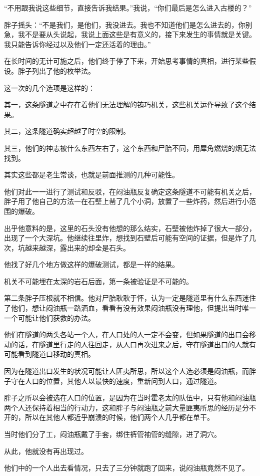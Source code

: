“不用跟我说这些细节，直接告诉我结果。”我说，“你们最后是怎么进入古楼的？”

胖子摇头：“不是我们，是他们，我没进去。我也不知道他们是怎么进去的，你别急，我不是要从头说起，我说上面这些是有意义的，接下来发生的事情就是关键。我只能告诉你经过以及他们一定还活着的理由。”

在长时间的无计可施之后，他们终于停了下来，开始思考事情的真相，进行某些假设。胖子列出了他的枚举法。

这一次的几个选项是这样的：

其一，这条隧道之中存在着他们无法理解的铕巧机关，这些机关运作导致了这个结果。

其二，这条隧道确实超越了时空的限制。

其三，他们的神志被什么东西左右了，这个东西和尸胎不同，用犀角燃烧的烟无法找到。

其实这些都是老生常谈，也就是前面推测的几种可能性。

他们对此一一进行了测试和反驳，在闷油瓶反复确定这条隧道不可能有机关之后，胖子用了他自己的方法一在石壁上凿了几个小洞，放置了一些炸药，然后进行小范围的爆破。

出乎他意料的是，这里的石头没有他想的那么结实，石壁被他炸掉了很大一部分，出现了一个大深坑。他继续往里炸，想找到石壁后可能有空间的证据，但是炸了几次，坑越来越深，露出来的却全是石头。

他找了好几个地方做这样的爆破测试，都是一样的结果。

机关不可能埋在太深的岩石后面，第一条被验证是不可能的。

第二条胖子压根就不相信。他对尸胎耿耿于怀，认为一定是隧道里有什么东西迷住了他们，想让闷油瓶一路洒血，看看有没有效果闷油瓶没有理他，但提出当时唯一一个可能让他们获救的办法。

他们在隧道的两头各站一个人，在人口处的人一定不会变，但如果隧道的出口会移动的话，在隧道里行走的人往回走，从人口再次进来之后，守在隧道出口的人就有可能看到隧道口移动的真相。

因为在隧道出口发生的状况可能让人匪夷所思，所以这个人选必须是闷油瓶，而胖子守在人口的位置，其他人以最快的速度，重新问到人口，通过隧道。

胖子之所以会被选在人口的位置，是因为在当时霍老太的队伍中，只有他和闷油瓶两个人还保持着相当的行动力，这和胖子与闷油瓶之前大量匪夷所思的经历是分不开的，所以在其他人都近乎崩溃的时候，他们两个人几乎都在单干。

当时他们分了工，闷油瓶戴了手套，绑住裤管袖管的缝隙，进了洞穴。

从此，他就没有再出现过。

他们中的一个人出去看情况，只去了三分钟就跑了回来，说闷油瓶竟然不见了。

